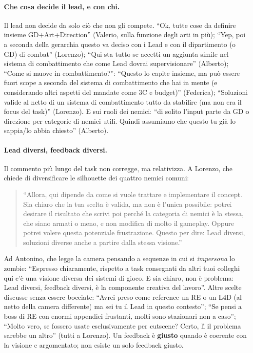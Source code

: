 \paragraph{Che cosa decide il lead, e con chi.} Il lead non decide da solo
ciò che non gli compete. ``Ok, tutte cose da definire insieme
GD+Art+Direction'' (Valerio, sulla funzione degli arti in più); ``Yep, poi a
seconda della gerarchia questo va deciso con i Lead e con il dipartimento (o
GD) di combat'' (Lorenzo); ``Qui sta tutto se accetti un aggiunta simile nel
sistema di combattimento che come Lead dovrai supervisionare'' (Alberto); ``Come
si muove in combattimento?'': ``Questo lo capite insieme, ma può essere fuori
scope a seconda del sistema di combattimento che hai in mente (e considerando
altri aspetti del mandate come 3C e budget)'' (Federica); ``Soluzioni valide
al netto di un sistema di combattimento tutto da stabilire (ma non era il
focus del task)'' (Lorenzo). E sui ruoli dei nemici: ``di solito l'input parte
da GD o direzione per categorie di nemici utili. Quindi assumiamo che questo
tu già lo sappia/lo abbia chiesto'' (Alberto).

\paragraph{Lead diversi, feedback diversi.} Il commento più lungo del task
non corregge, ma relativizza. A Lorenzo, che chiede di diversificare le
silhouette dei quattro nemici comuni:
\begin{quote}
  ``Allora, qui dipende da come si vuole trattare e implementare il concept.
  Sia chiaro che la tua scelta è valida, ma non è l'unica possibile: potrei
  desirare il risultato che scrivi poi perché la categoria di nemici è la
  stessa, che siano armati o meno, e non modifica di molto il gameplay.
  Oppure potrei volere questa potenziale frustrazione. Questo per dire: Lead
  diversi, soluzioni diverse anche a partire dalla stessa visione.''
\end{quote}
Ad Antonino, che legge la camera pensando a sequenze in cui si
\emph{impersona} lo zombie: ``Espresso chiaramente, rispetto a task consegnati
da altri tuoi colleghi qui c'è una visione diversa dei sistemi di gioco. E sia
chiaro, non è problema: Lead diversi, feedback diversi, è la componente
creativa del lavoro''. Altre scelte discusse senza essere bocciate: ``Avrei
preso come reference un RE o un L4D (al netto della camera differente) ma sei
tu il Lead in questo contesto''; ``Se pensi a boss di RE con enormi appendici
frustanti, molti sono stazionari non a caso''; ``Molto vero, se fossero usate
esclusivamente per cutscene? Certo, lì il problema sarebbe un altro'' (tutti
a Lorenzo). Un feedback è \textbf{giusto} quando è coerente con la visione e
argomentato; non esiste un solo feedback giusto.

